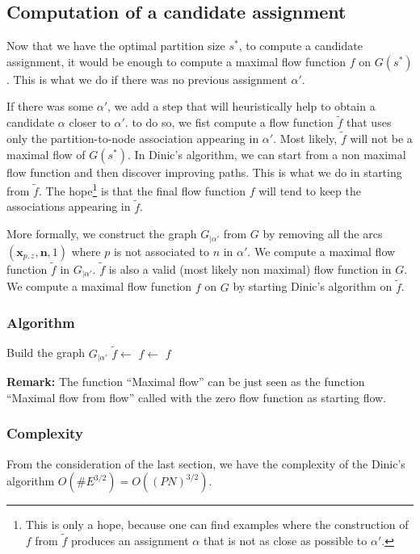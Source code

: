 \documentclass[]{article}
\begin{document}
\subsection{Computation of a candidate assignment}

Now that we have the optimal partition size $s^*$, to compute a candidate assignment, it would be enough to compute a maximal flow function $f$ on $G(s^*)$. This is what we do if there was no previous assignment $\alpha'$.

If there was some $\alpha'$, we add a step that will heuristically help to obtain a candidate $\alpha$ closer to $\alpha'$. to do so, we fist compute a flow function $\tilde{f}$ that uses only the partition-to-node association appearing in $\alpha'$. Most likely, $\tilde{f}$ will not be a maximal flow of $G(s^*)$. In Dinic's algorithm, we can start from a non maximal flow function and then discover improving paths. This is what we do in starting from $\tilde{f}$. The hope\footnote{This is only a hope, because one can find examples where the construction of $f$ from $\tilde{f}$ produces an assignment $\alpha$ that is not as close as possible to $\alpha'$.} is that the final flow function $f$ will tend to keep the associations appearing in $\tilde{f}$.

More formally, we construct the graph $G_{|\alpha'}$ from $G$ by removing all the arcs $(\mathbf{x}_{p,z},\mathbf{n}, 1)$ where $p$ is not associated to $n$ in $\alpha'$. We compute a maximal flow function $\tilde{f}$ in $G_{|\alpha'}$. $\tilde{f}$ is also a valid (most likely non maximal) flow function in $G$. We compute a maximal flow function $f$ on $G$ by starting Dinic's algorithm on $\tilde{f}$.

\subsubsection*{Algorithm}
\begin{algorithmic}[1]
	\State Build the graph $G_{|\alpha'}$
	\State $ \tilde{f} \leftarrow$ 
	\State $ f \leftarrow$ 
	\State \Return $f$
	\EndFunction
\end{algorithmic}

\textbf{Remark:} The function ``Maximal flow'' can be just seen as the function ``Maximal flow from flow'' called with the zero flow function as starting flow.

\subsubsection*{Complexity}
From the consideration of the last section, we have the complexity of the Dinic's algorithm $O(\#E^{3/2}) = O((PN)^{3/2})$.
\end{document}
